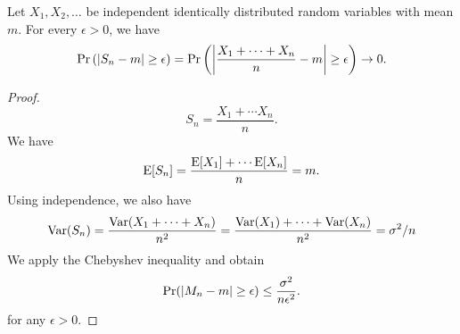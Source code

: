 \begin{theorem}
Let $X_1, X_2, \ldots$ be independent identically distributed random variables with mean $m$.
For every $\epsilon > 0$, we have
\begin{equation*}
\Pr \left( |S_n - m| \geq \epsilon \right)
= \Pr \left( \left| \frac{X_1 + \cdots + X_n}{n} - m \right| \geq \epsilon \right) \rightarrow 0.
\end{equation*}
\end{theorem}
\begin{proof}
\begin{equation*}
S_n = \frac{X_1 + \cdots X_n}{n} .
\end{equation*}
We have
\begin{equation*}
\mathrm{E} [S_n] = 
\frac{\mathrm{E} [X_1] + \cdots \mathrm{E} [X_n]}{n} = m .
\end{equation*}
Using independence, we also have
\begin{equation*}
\mathrm{Var} (S_n) = \frac{ \mathrm{Var}( X_1 + \cdots + X_n )}{n^2}
= \frac{ \mathrm{Var}( X_1 ) + \cdots + \mathrm{Var}(X_n )}{n^2}
= \sigma^2 / n
\end{equation*}
We apply the Chebyshev inequality and obtain
\begin{equation*}
\Pr (|M_n - m| \geq \epsilon) \leq \frac{ \sigma^2}{n \epsilon^2} .
\end{equation*}
for any $\epsilon > 0$.
\end{proof}
